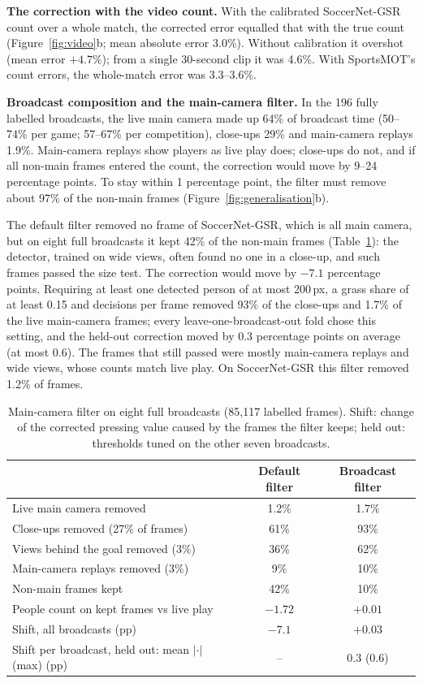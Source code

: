 \documentclass[]{interact}
\begin{document}
\textbf{The correction with the video count.} With the calibrated SoccerNet-GSR count over a whole match, the corrected
error equalled that with the true count (Figure~\ref{fig:video}b; mean absolute error 3.0\%). Without calibration it
overshot (mean error $+4.7\%$); from a single 30-second clip it was 4.6\%. With SportsMOT's count errors, the
whole-match error was 3.3--3.6\%.

\textbf{Broadcast composition and the main-camera filter.} In the 196 fully labelled broadcasts, the live main camera
made up 64\% of broadcast time (50--74\% per game; 57--67\% per competition), close-ups 29\% and main-camera replays
1.9\%. Main-camera replays show players as live play does; close-ups do not, and if all non-main frames entered the
count, the correction would move by 9--24 percentage points. To stay within 1 percentage point, the filter must remove
about 97\% of the non-main frames (Figure~\ref{fig:generalisation}b).

The default filter removed no frame of SoccerNet-GSR, which is all main camera, but on eight full broadcasts it kept
42\% of the non-main frames (Table~\ref{tab:filter}): the detector, trained on wide views, often found no one in a
close-up, and such frames passed the size test. The correction would move by $-7.1$ percentage points. Requiring at
least one detected person of at most 200\,px, a grass share of at least 0.15 and decisions per frame removed 93\% of
the close-ups and 1.7\% of the live main-camera frames; every leave-one-broadcast-out fold chose this setting, and the
held-out correction moved by 0.3 percentage points on average (at most 0.6). The frames that still passed were mostly
main-camera replays and wide views, whose counts match live play. On SoccerNet-GSR this filter removed 1.2\% of frames.

\begin{table}[t]
\centering
\caption{Main-camera filter on eight full broadcasts (85{,}117 labelled frames). Shift: change of the corrected
pressing value caused by the frames the filter keeps; held out: thresholds tuned on the other seven broadcasts.}
\label{tab:filter}
\begin{tabular}{lcc}
\toprule
 & Default filter & Broadcast filter \\
\midrule
Live main camera removed & 1.2\% & 1.7\% \\
Close-ups removed (27\% of frames) & 61\% & 93\% \\
Views behind the goal removed (3\%) & 36\% & 62\% \\
Main-camera replays removed (3\%) & 9\% & 10\% \\
Non-main frames kept & 42\% & 10\% \\
People count on kept frames vs live play & $-1.72$ & $+0.01$ \\
Shift, all broadcasts (pp) & $-7.1$ & $+0.03$ \\
Shift per broadcast, held out: mean $|\cdot|$ (max) (pp) & -- & 0.3 (0.6) \\
\bottomrule
\end{tabular}
\end{table}
\end{document}
